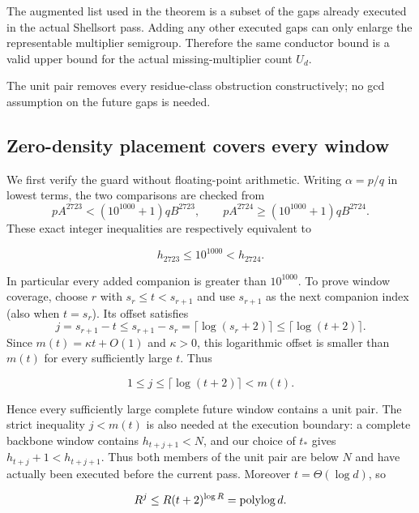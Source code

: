 The augmented list used in the theorem is a subset of the gaps already
executed in the actual Shellsort pass.  Adding any other executed gaps can only
enlarge the representable multiplier semigroup.  Therefore the same conductor
bound is a valid upper bound for the actual missing-multiplier count $U_d$.

The unit pair removes every residue-class obstruction constructively; no gcd
assumption on the future gaps is needed.

\subsection{Zero-density placement covers every window}

We first verify the guard without floating-point arithmetic.  Writing
$\alpha=p/q$ in lowest terms, the two comparisons are checked from
\[
  pA^{2723}<(10^{1000}+1)qB^{2723},\qquad
  pA^{2724}\ge(10^{1000}+1)qB^{2724}.
\]
These exact integer inequalities are respectively equivalent to

\begin{equation}
  h_{2723}\le10^{1000}<h_{2724}.
  \label{eq:guard-check}
\end{equation}

In particular every added companion is greater than $10^{1000}$.  To prove
window coverage, choose $r$ with $s_r\le t<s_{r+1}$ and use $s_{r+1}$ as the
next companion index (also when $t=s_r$).  Its offset satisfies
\[
  j=s_{r+1}-t
  \le s_{r+1}-s_r
  =\lceil\log(s_r+2)\rceil
  \le\lceil\log(t+2)\rceil.
\]
Since $m(t)=\kappa t+O(1)$ and $\kappa>0$, this logarithmic offset is smaller
than $m(t)$ for every sufficiently large $t$.  Thus

\begin{equation}
  1\le j\le\lceil\log(t+2)\rceil<m(t).
  \label{eq:nearby-companion}
\end{equation}

Hence every sufficiently large complete future window contains a unit pair.
The strict inequality $j<m(t)$ is also needed at the execution boundary: a
complete backbone window contains $h_{t+j+1}<N$, and our choice of $t_*$ gives
$h_{t+j}+1<h_{t+j+1}$.  Thus both members of the unit pair are below $N$ and
have actually been executed before the current pass.
Moreover $t=\Theta(\log d)$, so

\begin{equation}
  R^j\le R(t+2)^{\log R}=\operatorname{polylog} d.
  \label{eq:unit-polylog}
\end{equation}

